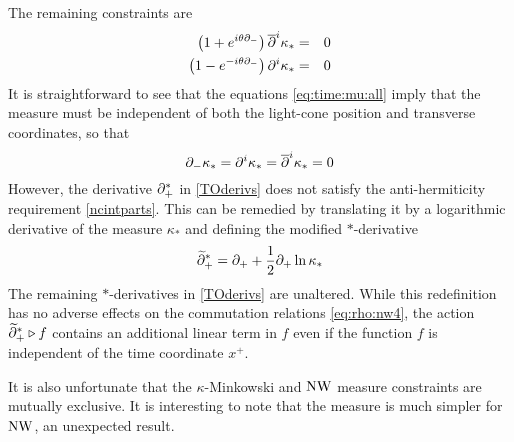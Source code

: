The remaining constraints are
\begin{eqnarray}
  \label{eq:time:mu:all}
  \left(1+e^{i \theta \partial_-}\right)\overline{\partial}^{ i}\kappa_\ast&=&0 \\\nonumber
  \left(1-e^{-i \theta \partial_-}\right)\partial^i\kappa_\ast&=&0
\end{eqnarray}
It is straightforward to see that the equations \eqref{eq:time:mu:all} imply
that the measure must be independent of both the light-cone position and
transverse coordinates, so that
\begin{equation}
  \label{eq:time:mu}
  \partial_-\kappa_\ast=\partial^i\kappa_\ast=\overline{\partial}^{ i}\kappa_\ast=0 
\end{equation}
However, the derivative $\partial_+^\ast$ in \eqref{TOderivs} does not
satisfy the anti-hermiticity requirement \eqref{ncintparts}. This can be
remedied by translating it by a logarithmic derivative of the measure
$\kappa_*$ and defining the modified $*$-derivative
\begin{equation}
  \label{eq:time:d}
 \widetilde{\partial}^{ \ast}_+=\partial_+ + \frac12 \partial_+\ln\kappa_\ast 
\end{equation}
The remaining $*$-derivatives in \eqref{TOderivs} are unaltered. While this
redefinition has no adverse effects on the commutation relations
\eqref{eq:rho:nw4}, the action $\widetilde{\partial}^{ \ast}_+\triangleright f$ contains
an additional linear term in $f$ even if the function $f$ is independent of the
time coordinate $x^+$.

It is also unfortunate that the $\kappa$-Minkowski and $\operatorname{NW}$ measure constraints
are mutually exclusive. It is interesting to note that the measure is much
simpler for $\operatorname{NW}$, an unexpected result.


